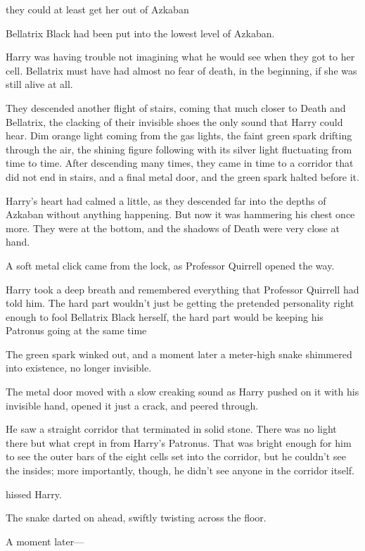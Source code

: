 {\el} they could at least get her out of Azkaban{\el}

Bellatrix Black had been put into the lowest level of Azkaban.

Harry was having trouble not imagining what he would see when they got to her
cell. Bellatrix must have had almost no fear of death, in the beginning, if she
was still alive at all.

They descended another flight of stairs, coming that much closer to Death and
Bellatrix, the clacking of their invisible shoes the only sound that Harry
could hear. Dim orange light coming from the gas lights, the faint green spark
drifting through the air, the shining figure following with its silver light
fluctuating from time to time.
\sbreak
After descending many times, they came in time to a corridor that did not end
in stairs, and a final metal door, and the green spark halted before it.

Harry's heart had calmed a little, as they descended far into the depths of
Azkaban without anything happening. But now it was hammering his chest once
more. They were at the bottom, and the shadows of Death were very close at hand.

A soft metal click came from the lock, as Professor Quirrell opened the way.

Harry took a deep breath and remembered everything that Professor Quirrell had
told him. The hard part wouldn't just be getting the pretended personality
right enough to fool Bellatrix Black herself, the hard part would be keeping
his Patronus going at the same time{\el}

The green spark winked out, and a moment later a meter-high snake shimmered
into existence, no longer invisible.

The metal door moved with a slow creaking sound as Harry pushed on it with his
invisible hand, opened it just a crack, and peered through.

He saw a straight corridor that terminated in solid stone. There was no light
there but what crept in from Harry's Patronus. That was bright enough for him
to see the outer bars of the eight cells set into the corridor, but he couldn't
see the insides; more importantly, though, he didn't see anyone in the corridor
itself.

 hissed Harry.

The snake darted on ahead, swiftly twisting across the floor.

A moment later---

